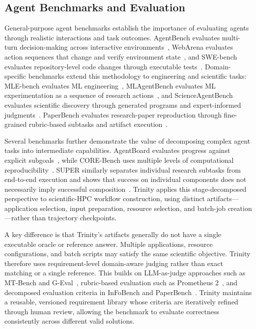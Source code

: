 \documentclass[conference]{IEEEtran}
\begin{document}
\subsection{Agent Benchmarks and Evaluation}

General-purpose agent benchmarks establish the importance of evaluating agents through realistic interactions and task outcomes. AgentBench evaluates multi-turn decision-making across interactive environments~\cite{liu2023agentbench}, WebArena evaluates action sequences that change and verify environment state~\cite{zhou2024webarena}, and SWE-bench evaluates repository-level code changes through executable tests~\cite{jimenez2024swebench}. Domain-specific benchmarks extend this methodology to engineering and scientific tasks: MLE-bench evaluates ML engineering~\cite{chan2025mlebench}, MLAgentBench evaluates ML experimentation as a sequence of research actions~\cite{huang2024mlagentbench}, and ScienceAgentBench evaluates scientific discovery through generated programs and expert-informed judgments~\cite{chen2025scienceagentbench}. PaperBench evaluates research-paper reproduction through fine-grained rubric-based subtasks and artifact execution~\cite{starace2025paperbench}.

Several benchmarks further demonstrate the value of decomposing complex agent tasks into intermediate capabilities. AgentBoard evaluates progress against explicit subgoals~\cite{ma2024agentboard}, while CORE-Bench uses multiple levels of computational reproducibility~\cite{siegel2024corebench}. SUPER similarly separates individual research subtasks from end-to-end execution and shows that success on individual components does not necessarily imply successful composition~\cite{bogin2024super}. Trinity applies this stage-decomposed perspective to scientific-HPC workflow construction, using distinct artifacts---application selection, input preparation, resource selection, and batch-job creation---rather than trajectory checkpoints.

A key difference is that Trinity's artifacts generally do not have a single executable oracle or reference answer. Multiple applications, resource configurations, and batch scripts may satisfy the same scientific objective. Trinity therefore uses requirement-level domain-aware judging rather than exact matching or a single reference. This builds on LLM-as-judge approaches such as MT-Bench and G-Eval~\cite{zheng2023mtbench,liu2023geval}, rubric-based evaluation such as Prometheus 2~\cite{kim2024prometheus2}, and decomposed evaluation criteria in InFoBench and PaperBench~\cite{qin2024infobench,starace2025paperbench}. Trinity maintains a reusable, versioned requirement library whose criteria are iteratively refined through human review, allowing the benchmark to evaluate correctness consistently across different valid solutions.
\end{document}
